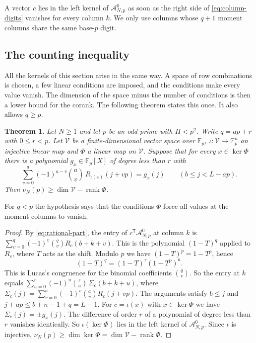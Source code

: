 \documentclass[11pt]{amsart}
\newtheorem{theorem}{Theorem}[section]
\theoremstyle{definition}
\theoremstyle{remark}
\numberwithin{equation}{section}
\newcommand{\F}{\mathbb F}
\newcommand{\cV}{\mathcal V}
\newcommand{\cA}{\mathcal A}
\begin{document}
A vector $c$ lies in the left kernel of $\cA^0_{N,p}$ as soon as the right side of
\eqref{eq:column-digits} vanishes for every column $k$. We only use columns whose $q+1$ moment columns
share the same base-$p$ digit.

\subsection{The counting inequality}
All the kernels of this section arise in the same way. A space of row combinations is chosen, a few linear
conditions are imposed, and the conditions make every value vanish. The dimension of the space minus the
number of conditions is then a lower bound for the corank. The following theorem states this once. It also
allows $q\ge p$.

\begin{theorem}\label{thm:count}
Let $N\ge1$ and let $p$ be an odd prime with $H<p^2$. Write $q=ap+r$ with $0\le r<p$. Let $\cV$ be a
finite-dimensional vector space over $\F_p$, $\iota\colon\cV\to\F_p^n$ an injective linear map and $\Phi$ a
linear map on $\cV$. Suppose that for every $x\in\ker\Phi$ there is a polynomial $g_x\in\F_p[X]$ of degree
less than $r$ with
\[
 \sum_{v=0}^a(-1)^{a-v}\binom av\,R_{\iota(x)}(j+vp)=g_x(j)\qquad(b\le j<L-ap).
\]
Then $\nu_N(p)\ge\dim\cV-\operatorname{rank}\Phi$.
\end{theorem}

For $q<p$ the hypothesis says that the conditions $\Phi$ force all values at the moment columns to vanish.

\begin{proof}
By \eqref{eq:rational-part}, the entry of $c^{\mathsf T}\cA^0_{N,p}$ at column $k$ is
$\sum_{v=0}^q(-1)^v\binom qvR_c(b+k+v)$. This is the polynomial $(1-T)^q$ applied to $R_c$, where $T$ acts as
the shift. Modulo $p$ we have $(1-T)^p=1-T^p$, hence
\[
 (1-T)^q=(1-T)^r(1-T^p)^a .
\]
This is Lucas's congruence for the binomial coefficients $\binom qv$. So the entry at $k$ equals
$\sum_{u=0}^r(-1)^u\binom ru\,\Sigma_c(b+k+u)$, where
$\Sigma_c(j)=\sum_{v=0}^a(-1)^v\binom av R_c(j+vp)$. The arguments satisfy $b\le j$ and
$j+ap\le b+n-1+q=L-1$. For $c=\iota(x)$ with $x\in\ker\Phi$ we have $\Sigma_c(j)=\pm g_x(j)$. The difference
of order $r$ of a polynomial of degree less than $r$ vanishes identically. So $\iota(\ker\Phi)$ lies in the
left kernel of $\cA^0_{N,p}$. Since $\iota$ is injective, $\nu_N(p)\ge\dim\ker\Phi=\dim\cV-\operatorname{rank}\Phi$.
\end{proof}
\end{document}
